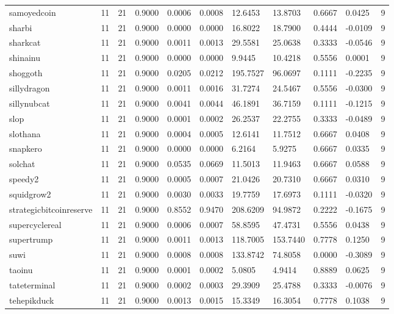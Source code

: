 \begin{table}[htbp]
\begin{tabular}{lllllllllll}
samoyedcoin & 11 & 21 & 0.9000 & 0.0006 & 0.0008 & 12.6453 & 13.8703 & 0.6667 & 0.0425 & 9 \\
sharbi & 11 & 21 & 0.9000 & 0.0000 & 0.0000 & 16.8022 & 18.7900 & 0.4444 & -0.0109 & 9 \\
sharkcat & 11 & 21 & 0.9000 & 0.0011 & 0.0013 & 29.5581 & 25.0638 & 0.3333 & -0.0546 & 9 \\
shinainu & 11 & 21 & 0.9000 & 0.0000 & 0.0000 & 9.9445 & 10.4218 & 0.5556 & 0.0001 & 9 \\
shoggoth & 11 & 21 & 0.9000 & 0.0205 & 0.0212 & 195.7527 & 96.0697 & 0.1111 & -0.2235 & 9 \\
sillydragon & 11 & 21 & 0.9000 & 0.0011 & 0.0016 & 31.7274 & 24.5467 & 0.5556 & -0.0300 & 9 \\
sillynubcat & 11 & 21 & 0.9000 & 0.0041 & 0.0044 & 46.1891 & 36.7159 & 0.1111 & -0.1215 & 9 \\
slop & 11 & 21 & 0.9000 & 0.0001 & 0.0002 & 26.2537 & 22.2755 & 0.3333 & -0.0489 & 9 \\
slothana & 11 & 21 & 0.9000 & 0.0004 & 0.0005 & 12.6141 & 11.7512 & 0.6667 & 0.0408 & 9 \\
snapkero & 11 & 21 & 0.9000 & 0.0000 & 0.0000 & 6.2164 & 5.9275 & 0.6667 & 0.0335 & 9 \\
solchat & 11 & 21 & 0.9000 & 0.0535 & 0.0669 & 11.5013 & 11.9463 & 0.6667 & 0.0588 & 9 \\
speedy2 & 11 & 21 & 0.9000 & 0.0005 & 0.0007 & 21.0426 & 20.7310 & 0.6667 & 0.0310 & 9 \\
squidgrow2 & 11 & 21 & 0.9000 & 0.0030 & 0.0033 & 19.7759 & 17.6973 & 0.1111 & -0.0320 & 9 \\
strategicbitcoinreserve & 11 & 21 & 0.9000 & 0.8552 & 0.9470 & 208.6209 & 94.9872 & 0.2222 & -0.1675 & 9 \\
supercyclereal & 11 & 21 & 0.9000 & 0.0006 & 0.0007 & 58.8595 & 47.4731 & 0.5556 & 0.0438 & 9 \\
supertrump & 11 & 21 & 0.9000 & 0.0011 & 0.0013 & 118.7005 & 153.7440 & 0.7778 & 0.1250 & 9 \\
suwi & 11 & 21 & 0.9000 & 0.0008 & 0.0008 & 133.8742 & 74.8058 & 0.0000 & -0.3089 & 9 \\
taoinu & 11 & 21 & 0.9000 & 0.0001 & 0.0002 & 5.0805 & 4.9414 & 0.8889 & 0.0625 & 9 \\
tateterminal & 11 & 21 & 0.9000 & 0.0002 & 0.0003 & 29.3909 & 25.4788 & 0.3333 & -0.0076 & 9 \\
tehepikduck & 11 & 21 & 0.9000 & 0.0013 & 0.0015 & 15.3349 & 16.3054 & 0.7778 & 0.1038 & 9 \\

\end{tabular}
\end{table}
